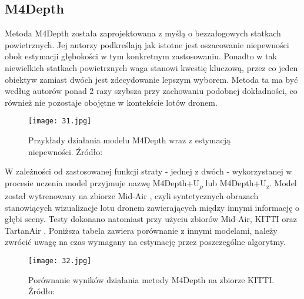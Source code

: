 \subsection{M4Depth}
Metoda M4Depth \cite{fonder2023technique} została zaprojektowana z myślą o bezzałogowych statkach powietrznych. Jej autorzy podkreślają jak istotne jest oszacowanie niepewności obok estymacji głębokości w tym konkretnym zastosowaniu. Ponadto w tak niewielkich statkach powietrznych waga stanowi kwestię kluczową, przez co jeden obiektyw zamiast dwóch jest zdecydowanie lepszym wyborem. Metoda ta ma być według autorów ponad 2 razy szybsza przy zachowaniu podobnej dokładności, co również nie pozostaje obojętne w kontekście lotów dronem.
\begin{figure}[H]
    \centering
    \texttt{[image: 31.jpg]}
    \caption{Przykłady działania modelu M4Depth wraz z estymacją niepewności. Źródło: \cite{fonder2023technique}}
    \label{fig:m4d-example}
\end{figure}
W zależności od zastosowanej funkcji straty - jednej z dwóch - wykorzystanej w procesie uczenia model przyjmuje nazwę M4Depth+U\textsubscript{$\rho$} lub M4Depth+U\textsubscript{z}.
Model został wytrenowany na zbiorze Mid-Air \cite{fonder2019midair}, czyli syntetycznych obrazach stanowiących wizualizacje lotu dronem zawierających między innymi informację o głębi sceny. Testy dokonano natomiast przy użyciu zbiorów Mid-Air, KITTI oraz TartanAir \cite{wang2020tartanair}. Poniższa tabela zawiera porównanie z innymi modelami, należy zwrócić uwagę na czas wymagany na estymację przez poszczególne algorytmy.
\begin{figure}[H]
    \centering
    \texttt{[image: 32.jpg]}
    \caption{Porównanie wyników działania metody M4Depth na zbiorze KITTI. Źródło: \cite{fonder2023technique}}
    \label{fig:m4d-comparison}
\end{figure}

